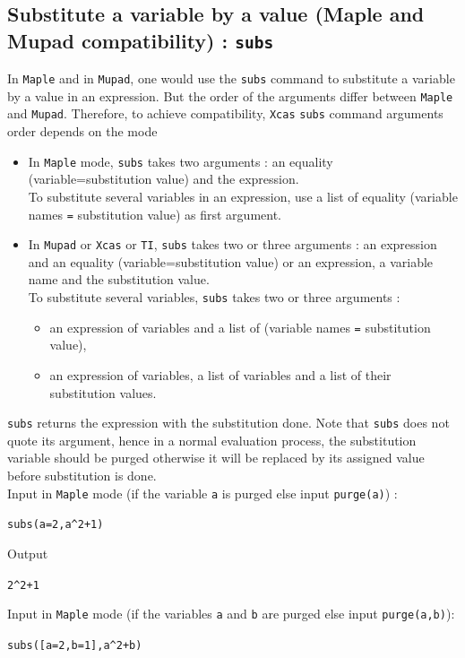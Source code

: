 \documentclass[a4paper,11pt]{book}
\begin{document}
\subsection{Substitute a variable by a value (Maple and Mupad compatibility) : {\tt subs}}\label{sec:subs}
\noindent In {\tt Maple} and in {\tt Mupad}, one would use the {\tt subs}
command to substitute a variable 
by a value in an expression. But the order of the arguments differ
between {\tt Maple} and {\tt Mupad}. Therefore, to achieve compatibility,
{\tt Xcas} {\tt subs} command arguments order depends on the mode
\begin{itemize}
\item
In {\tt Maple} mode,  {\tt subs} takes two arguments : an equality 
(variable=substitution value) and the expression.\\
To substitute several variables in an expression, use a list of equality
(variable names {\tt =} substitution value) as first argument.
\item In {\tt Mupad} or {\tt  Xcas} or {\tt TI}, {\tt subs} 
takes two or three arguments : 
an expression and an equality (variable=substitution value) or 
an expression, a variable name and the substitution value.\\
To substitute several variables, {\tt subs} takes two or three arguments :
\begin{itemize}
\item an expression of variables and a list of   
(variable names {\tt =} substitution value),
\item
an expression of variables, a list of variables and a list of their 
substitution values.
\end{itemize}
\end{itemize}
{\tt subs} returns the expression with the substitution done.
Note that {\tt subs} does not quote its argument, hence
in a normal evaluation process, the substitution variable should
be purged otherwise it will be replaced by its assigned value
before substitution is done.\\
Input in {\tt Maple} mode (if the variable {\tt a} is purged  else input 
{\tt purge(a)}) :
\begin{center}{\tt subs(a=2,a\verb|^|2+1)}\end{center}
Output 
\begin{center}{\tt 2\verb|^|2+1}\end{center}
Input in {\tt Maple} mode (if the variables {\tt a} and {\tt b} are purged
  else input {\tt purge(a,b)}):
\begin{center}{\tt subs([a=2,b=1],a\verb|^|2+b)}\end{center} 
\end{document}
